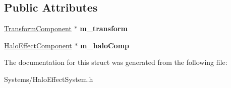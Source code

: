 \subsection*{Public Attributes}
\begin{DoxyCompactItemize}
\item 
\mbox{\label{structHaloEffectCompNode_a02850073192f5ff78437836fd3022ff7}} 
\hyperlink{classTransformComponent}{Transform\+Component} $\ast$ {\bfseries m\+\_\+transform}
\item 
\mbox{\label{structHaloEffectCompNode_ae2c0a8dceefc08f565acdd067b21c41d}} 
\hyperlink{classHaloEffectComponent}{Halo\+Effect\+Component} $\ast$ {\bfseries m\+\_\+halo\+Comp}
\end{DoxyCompactItemize}


The documentation for this struct was generated from the following file\+:\begin{DoxyCompactItemize}
\item 
Systems/Halo\+Effect\+System.\+h\end{DoxyCompactItemize}
